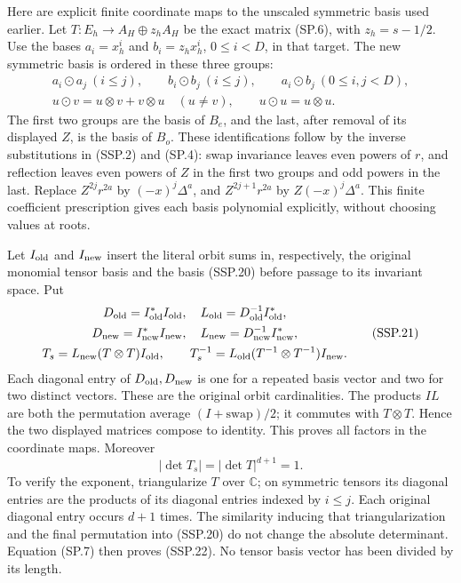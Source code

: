 Here are explicit finite coordinate maps to the unscaled symmetric
basis used earlier.  Let \(T:E_h\to A_H\oplus z_hA_H\)
be the exact matrix (SP.6), with \(z_h=s-1/2\).
Use the bases \(a_i=x_h^i\) and \(b_i=z_hx_h^i\),
\(0\le i<D\), in that target.  The new symmetric basis is
ordered in these three groups:
\[
 \begin{gathered}
 a_i\odot a_j\ (i\le j),\qquad
 b_i\odot b_j\ (i\le j),\qquad
 a_i\odot b_j\ (0\le i,j<D),\\
 u\odot v=u\otimes v+v\otimes u\quad(u\ne v),\qquad
 u\odot u=u\otimes u .
 \end{gathered}                                                    \tag{SSP.20}
\]
The first two groups are the basis of \(B_e\), and the last,
after removal of its displayed \(Z\), is the basis of \(B_o\).
These identifications follow by the inverse substitutions in
(SSP.2) and (SP.4): swap invariance leaves even powers of \(r\),
and reflection leaves even powers of \(Z\) in the first two groups
and odd powers in the last.  Replace \(Z^{2j}r^{2a}\) by
\((-x)^j\Delta^a\), and \(Z^{2j+1}r^{2a}\) by
\(Z(-x)^j\Delta^a\).  This finite coefficient prescription gives
each basis polynomial explicitly, without choosing values at roots.

Let \(I_{\rm old}\) and \(I_{\rm new}\) insert the literal orbit
sums in, respectively, the original monomial tensor basis and
the basis (SSP.20) before passage to its invariant space.
Put
\[
 \begin{gathered}
 D_{\rm old}=I_{\rm old}^*I_{\rm old},\quad
 L_{\rm old}=D_{\rm old}^{-1}I_{\rm old}^*,\\
 D_{\rm new}=I_{\rm new}^*I_{\rm new},\quad
 L_{\rm new}=D_{\rm new}^{-1}I_{\rm new}^*,\\
 T_s=L_{\rm new}(T\otimes T)I_{\rm old},\qquad
 T_s^{-1}=L_{\rm old}(T^{-1}\otimes T^{-1})I_{\rm new}.
 \end{gathered}                                                    \tag{SSP.21}
\]
Each diagonal entry of \(D_{\rm old},D_{\rm new}\) is one for
a repeated basis vector and two for two distinct vectors.
These are the original orbit cardinalities.  The products \(IL\)
are both the permutation average \((I+\mathrm{swap})/2\);
it commutes with \(T\otimes T\).  Hence the two displayed
matrices compose to identity.  This proves all factors in the
coordinate maps.  Moreover
\[
 |\det T_s|=|\det T|^{d+1}=1.
 \tag{SSP.22}
\]
To verify the exponent, triangularize \(T\) over \(\mathbb C\);
on symmetric tensors its diagonal entries are the products of
its diagonal entries indexed by \(i\le j\).  Each original
diagonal entry occurs \(d+1\) times.  The similarity inducing
that triangularization and the final permutation into (SSP.20)
do not change the absolute determinant.  Equation (SP.7)
then proves (SSP.22).  No tensor basis vector has been divided
by its length.

